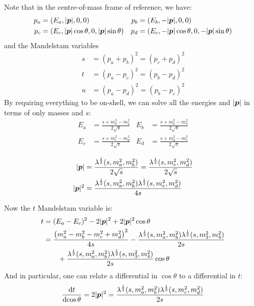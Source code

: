 \documentclass{scrartcl}
\begin{document}
Note that in the centre-of-mass frame of reference, we have:
\begin{align}
  p_a & = (E_a, \lvert\boldsymbol{p}\rvert, 0, 0)                                       & p_b & = (E_b, -\lvert\boldsymbol{p}\rvert, 0, 0) \\
  p_c & = (E_c, \lvert\boldsymbol{p}\rvert \cos \theta, 0, \lvert\boldsymbol{p}\rvert \sin \theta)     &
  p_d & = (E_c, - \lvert\boldsymbol{p}\rvert \cos \theta, 0, - \lvert\boldsymbol{p}\rvert \sin \theta)
\end{align}
and the Mandelstam variables
\begin{align}
  s & = (p_a + p_b)^2 = (p_c + p_d)^2 \\
  t & = (p_a - p_c)^2 = (p_b - p_d)^2 \\
  u & = (p_a - p_d)^2 = (p_b - p_c)^2
\end{align}
By requiring everything to be on-shell, we can solve all the energies and
\(\lvert\boldsymbol{p}\rvert\) in terms of only masses and \(s\):
\begin{align}
  E_a & = \frac{s + m_a^2 - m_b^2}{2 \sqrt{s}} &
  E_b & = \frac{s + m_b^2 - m_a^2}{2 \sqrt{s}}   \\
  E_c & = \frac{s + m_c^2 - m_d^2}{2 \sqrt{s}} &
  E_d & = \frac{s + m_d^2 - m_c^2}{2 \sqrt{s}}   \\
\end{align}
\begin{equation}
  \begin{aligned}
    \lvert\boldsymbol{p}\rvert   & = \frac{\lambda^{\frac{1}{2}}(s, m_a^2, m_b^2)}{2 \sqrt{s}} = \frac{\lambda^{\frac{1}{2}}(s, m_c^2, m_d^2)}{2 \sqrt{s}} \\
    \lvert\boldsymbol{p}\rvert^2 & = \frac{\lambda^{\frac{1}{2}}(s, m_a^2, m_b^2) \lambda^{\frac{1}{2}}(s, m_c^2, m_d^2)}{4 s}
  \end{aligned}
\end{equation}

Now the \(t\) Mandelstam variable is:
\begin{align}
  t & = (E_a - E_c)^2 - 2 \lvert\boldsymbol{p}\rvert^2 + 2 \lvert\boldsymbol{p}\rvert^2 \cos \theta                                                \\
    & = \frac{\left( m_a^2 - m_b^2 - m_c^2 + m_d^2 \right)^2}{4 s}
  - \frac{\lambda^{\frac{1}{2}}(s, m_a^2, m_b^2) \lambda^{\frac{1}{2}}(s, m_3^2, m_4^2)}{2 s}                        \\
    & \qquad + \frac{\lambda^{\frac{1}{2}}(s, m_a^2, m_b^2) \lambda^{\frac{1}{2}}(s, m_3^2, m_4^2)}{2 s} \cos \theta
\end{align}
And in particular, one can relate a differential in \(\cos \theta\) to a differential in \(t\):
\begin{equation}
  \label{eq:t_angular}
  \frac{\mathop{}\!\mathrm{d}{t}}{\mathop{}\!\mathrm{d}{\cos \theta}} = 2 \lvert\boldsymbol{p}\rvert^2 = \frac{\lambda^{\frac{1}{2}}(s, m_a^2, m_b^2) \lambda^{\frac{1}{2}}(s, m_c^2, m_d^2)}{2 s}
\end{equation}
\end{document}
